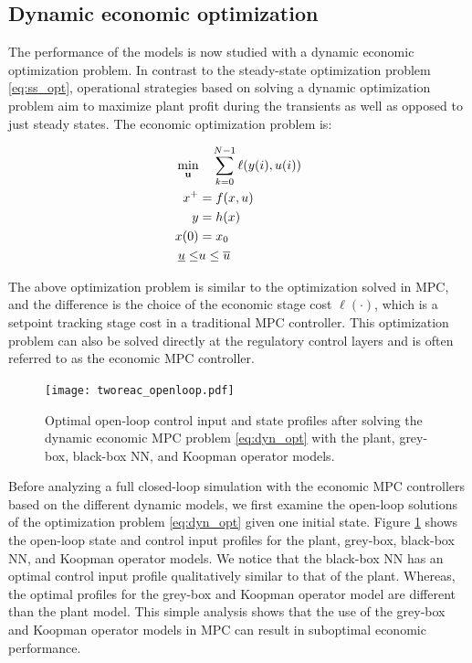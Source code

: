 \documentclass[10pt]{article}
\newcommand{\useq}{\mathbf{u}} \newcommand{\xseq}{\mathbf{x}}
\begin{document}
\subsection{Dynamic economic optimization}
The performance of the models is now studied with a dynamic economic
optimization problem. In contrast to the steady-state optimization problem
\eqref{eq:ss_opt}, operational strategies based on solving a dynamic
optimization problem aim to maximize plant profit during the transients as well
as opposed to just steady states. The economic optimization problem is:

\begin{align} \label{eq:dyn_opt}
  \underset{\useq}{\textnormal{min}} & \quad \sum_{k=0}^{N-1} \ell(y(i), u(i)) \\
  x^+ &= f(x, u) \nonumber \\ 
  y &= h(x) \nonumber \\
  x(0) &= x_0 \nonumber \\ 
  \underline{u} \leq &u \leq \overline{u} \nonumber
\end{align}

The above optimization problem is similar to the optimization solved in MPC, and
the difference is the choice of the economic stage cost $\ell(\cdot)$, which is
a setpoint tracking stage cost in a traditional MPC controller. This
optimization problem can also be solved directly at the regulatory control
layers and is often referred to as the economic MPC controller.

\begin{figure}[!h]
  \centering
  \texttt{[image: tworeac\_openloop.pdf]} \caption{Optimal
                   open-loop control input and state profiles after solving the
                   dynamic economic MPC problem \eqref{eq:dyn_opt} with the
                   plant, grey-box, black-box NN, and Koopman operator models.}
  \label{fig:tworeac_openloop}
\end{figure}

Before analyzing a full closed-loop simulation with the economic MPC controllers
based on the different dynamic models, we first examine the open-loop solutions
of the optimization problem \eqref{eq:dyn_opt} given one initial state. Figure
\ref{fig:tworeac_openloop} shows the open-loop state and control input profiles
for the plant, grey-box, black-box NN, and Koopman operator models. We notice
that the black-box NN has an optimal control input profile qualitatively similar
to that of the plant. Whereas, the optimal profiles for the grey-box and Koopman
operator model are different than the plant model. This simple analysis shows
that the use of the grey-box and Koopman operator models in MPC can result in
suboptimal economic performance.
\end{document}
